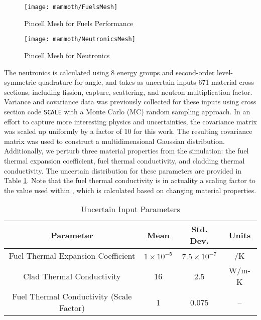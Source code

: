 \begin{figure}[H]
  \centering
  \texttt{[image: mammoth/FuelsMesh]}
  \caption{Pincell Mesh for Fuels Performance \cite{physormammoth}}
  \label{fig:pincell fuel mesh}
\end{figure}
\begin{figure}[H]
  \centering
  \texttt{[image: mammoth/NeutronicsMesh]}
  \caption{Pincell Mesh for Neutronics \cite{physormammoth}}
  \label{fig:pincell neutron mesh}
\end{figure}

The neutronics is calculated using 8 energy groups and second-order level-symmetric quadrature for angle, and 
takes as uncertain inputs 671 material cross
sections, including fission, capture, scattering, and neutron multiplication factor.  Variance and covariance
data was previously collected for these inputs using cross section code \texttt{SCALE} \cite{scale} with a Monte Carlo (MC)
random sampling approach.  In an effort to capture more interesting physics and uncertainties, the covariance
matrix was scaled up uniformly by a factor of 10 for this work.  The resulting covariance matrix was used to
construct a multidimensional Gaussian distribution.  Additionally, we perturb three material properties from
the \bison{} simulation: the fuel thermal expansion coefficient, fuel thermal conductivity, and cladding
thermal conductivity.  The uncertain distribution for these parameters are provided in Table 
\ref{tab:pincell bison distros}.  Note that the fuel thermal conductivity is in actuality a scaling factor to
the value used within \bison{}, which is calculated based on changing material properties.
\begin{table}
  \centering
  \begin{tabular}{c|c c|c}
    Parameter & Mean & Std. Dev. & Units \\ \hline
    Fuel Thermal Expansion Coefficient & $1\times10^{-5}$ & $7.5\times10^{-7}$ & /K\\
    Clad Thermal Conductivity & 16 & 2.5 & W/m-K\\
    Fuel Thermal Conductivity (Scale Factor) & 1 & 0.075 & --
  \end{tabular}
  \caption{\bison{} Uncertain Input Parameters}
  \label{tab:pincell bison distros}
\end{table}

